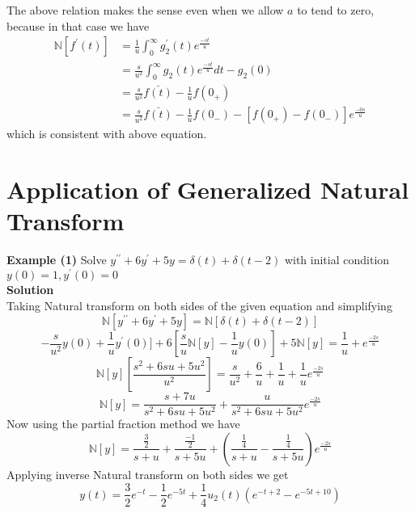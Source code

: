 The above relation makes the sense even when we allow $a$ to tend to zero, because in that case we have
\begin{align*}
\mathbb{N}[f^{\prime}(t)]&=\frac{1}{u}\int_{0}^{\infty}g_{2}^{\prime}(t)e^{\frac{-st}{u}}\\
&=\frac{s}{u^{2}}\int_{0}^{\infty}g_{2}(t)e^{\frac{-st}{u}}dt-g_{2}(0)\\
&=\frac{s}{u^{2}}\bar{f(t)}-\frac{1}{u}f(0_{+})\\
&=\frac{s}{u^{2}}\bar{f(t)}-\frac{1}{u}f(0_{-})-[f(0_{+})-f(0_{-})]e^{\frac{-0s}{u}}
\end{align*}
which is consistent with above equation.
\section{Application of Generalized Natural Transform}
\textbf{Example (1)} Solve $y^{\prime\prime}+6y^{\prime}+5y=\delta(t)+\delta(t-2)$ with initial condition $y(0)=1,y^{\prime}(0)=0$\\
\textbf{Solution} \\
Taking Natural transform on both sides of the given equation and simplifying
\begin{equation*}
\mathbb{N}[y^{\prime\prime}+6y^{\prime}+5y]=\mathbb{N}[\delta(t)+\delta(t-2)]
\end{equation*}
\begin{equation*}
[\frac{s^2}{u^2}\mathbb{N}[y]-\frac{s}{u^2}y(0)+\frac{1}{u}y^{\prime}(0)]+6[\frac{s}{u}\mathbb{N}[y]-\frac{1}{u}y(0)]+5\mathbb{N}[y]=\frac{1}{u}+e^{\frac{-2s}{u}}
\end{equation*}
\begin{equation*}
\mathbb{N}[y][\frac{s^2+6su+5u^2}{u^2}]=\frac{s}{u^2}+\frac{6}{u}+\frac{1}{u}+\frac{1}{u}e^{\frac{-2s}{u}}
\end{equation*}
\begin{equation*}
\mathbb{N}[y]=\frac{s+7u}{s^2+6su+5u^2}+\frac{u}{s^2+6su+5u^2}e^{\frac{-2s}{u}}
\end{equation*}
Now using the partial fraction method  we have
\begin{equation*}
\mathbb{N}[y]=\frac{\frac{3}{2}}{s+u}+\frac{\frac{-1}{2}}{s+5u}+(\frac{\frac{1}{4}}{s+u}-\frac{\frac{1}{4}}{s+5u})e^{\frac{-2s}{u}}
\end{equation*}
Applying inverse Natural transform on both sides we get
\begin{equation}
y(t)=\frac{3}{2}e^{-t}-\frac{1}{2}e^{-5t}+\frac{1}{4}u_{2}(t)(e^{-t+2}-e^{-5t+10})
\end{equation}
